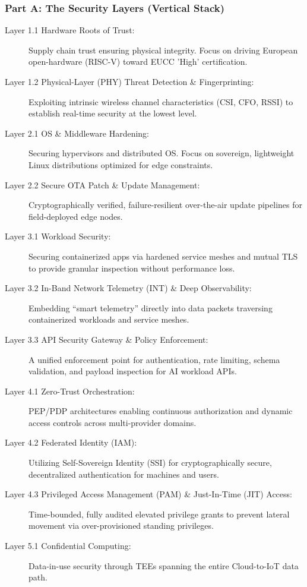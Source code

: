 \documentclass[12pt,a4paper]{report}
\begin{document}
\subsubsection{Part A: The Security Layers (Vertical Stack)}
\begin{description}
    \item[Layer 1.1 Hardware Roots of Trust:] Supply chain trust ensuring physical integrity. Focus on driving European open-hardware (RISC-V) toward EUCC 'High' certification.
    \item[Layer 1.2 Physical-Layer (PHY) Threat Detection \& Fingerprinting:] Exploiting intrinsic wireless channel characteristics (CSI, CFO, RSSI) to establish real-time security at the lowest level.
    \item[Layer 2.1 OS \& Middleware Hardening:] Securing hypervisors and distributed OS. Focus on sovereign, lightweight Linux distributions optimized for edge constraints.
    \item[Layer 2.2 Secure OTA Patch \& Update Management:] Cryptographically verified, failure-resilient over-the-air update pipelines for field-deployed edge nodes.
    \item[Layer 3.1 Workload Security:] Securing containerized apps via hardened service meshes and mutual TLS to provide granular inspection without performance loss.
    \item[Layer 3.2 In-Band Network Telemetry (INT) \& Deep Observability:] Embedding ``smart telemetry'' directly into data packets traversing containerized workloads and service meshes.
    \item[Layer 3.3 API Security Gateway \& Policy Enforcement:] A unified enforcement point for authentication, rate limiting, schema validation, and payload inspection for AI workload APIs.
    \item[Layer 4.1 Zero-Trust Orchestration:] PEP/PDP architectures enabling continuous authorization and dynamic access controls across multi-provider domains.
    \item[Layer 4.2 Federated Identity (IAM):] Utilizing Self-Sovereign Identity (SSI) for cryptographically secure, decentralized authentication for machines and users.
    \item[Layer 4.3 Privileged Access Management (PAM) \& Just-In-Time (JIT) Access:] Time-bounded, fully audited elevated privilege grants to prevent lateral movement via over-provisioned standing privileges.
    \item[Layer 5.1 Confidential Computing:] Data-in-use security through TEEs spanning the entire Cloud-to-IoT data path.

\end{description}
\end{document}
